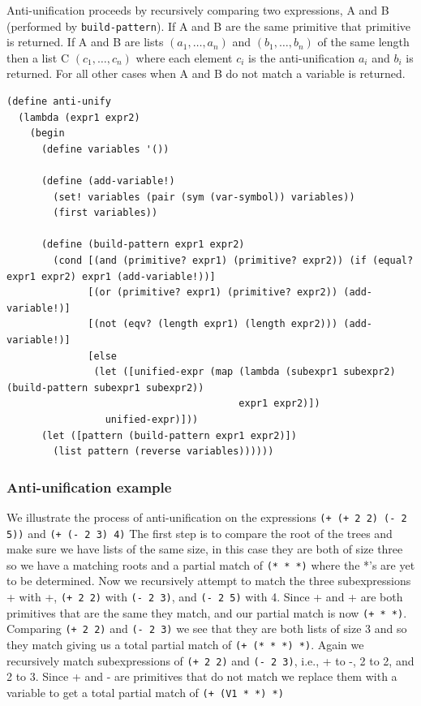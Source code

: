 \documentclass[a4paper,10pt]{article}
\begin{document}
Anti-unification proceeds by recursively comparing two expressions, A and B (performed by \texttt{build-pattern}).  If A and B are the same primitive that primitive is returned.  If A and B are lists $(a_1,\ldots,a_n)$ and $(b_1,\ldots,b_n)$ of the same length then a list C $(c_1,\ldots,c_n)$ where each element $c_i$ is the anti-unification $a_i$ and $b_i$ is returned.  For all other cases when A and B do not match a variable is returned.

\begin{lstlisting}[frame=trBL]
(define anti-unify
  (lambda (expr1 expr2)
    (begin
      (define variables '())

      (define (add-variable!)
        (set! variables (pair (sym (var-symbol)) variables))
        (first variables))
      
      (define (build-pattern expr1 expr2)
        (cond [(and (primitive? expr1) (primitive? expr2)) (if (equal? expr1 expr2) expr1 (add-variable!))]
              [(or (primitive? expr1) (primitive? expr2)) (add-variable!)]
              [(not (eqv? (length expr1) (length expr2))) (add-variable!)]
              [else
               (let ([unified-expr (map (lambda (subexpr1 subexpr2) (build-pattern subexpr1 subexpr2))
                                        expr1 expr2)])
                 unified-expr)]))
      (let ([pattern (build-pattern expr1 expr2)])
        (list pattern (reverse variables))))))
\end{lstlisting}

\subsubsection{Anti-unification example}
We illustrate the process of anti-unification on the expressions \texttt{(+ (+ 2 2) (- 2 5))} and \texttt{(+ (- 2 3) 4)}
The first step is to compare the root of the trees and make sure we have lists of the same size, in this case they are both of size three so we have a matching roots and a partial match of \texttt{(* * *)} where the *'s are yet to be determined.
Now we recursively attempt to match the three subexpressions + with +, \texttt{(+ 2 2)} with \texttt{(- 2 3)}, and \texttt{(- 2 5)} with 4.
Since + and + are both primitives that are the same they match, and our partial match is now \texttt{(+ * *)}.
Comparing \texttt{(+ 2 2)} and \texttt{(- 2 3)} we see that they are both lists of size 3 and so they match giving us a total partial match of \texttt{(+ (* * *) *)}.
Again we recursively match subexpressions of \texttt{(+ 2 2)} and \texttt{(- 2 3)}, i.e., + to -, 2 to 2, and 2 to 3.
Since + and - are primitives that do not match we replace them with a variable to get a total partial match of \texttt{(+ (V1 * *) *)}
\end{document}
